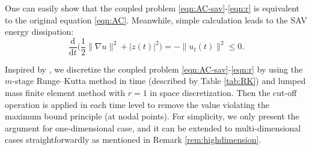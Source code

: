 \documentclass[10pt,final,leqno,onefignum,onetabnum]{siamltex}%
\def\d{\textrm{d}}
\def\d{\mathrm{d}}
\begin{document}
One can easily show that the coupled problem \eqref{eqn:AC-sav}-\eqref{eqn:r} is equivalent to the original
equation \eqref{eqn:AC}.  Meanwhile, simple calculation leads to the SAV energy dissipation:
\begin{equation}\label{eq:SAV_energy}
  \frac{\d}{\d t} \Big(\frac12\|\nabla u\|^2 + |z(t)|^2 \Big)=-\|u_t(t)\|^2 \le 0.
\end{equation}

Inspired by \cite{akrivis2019energy},
we discretize the coupled problem \eqref{eqn:AC-sav}-\eqref{eqn:r}
by using the  $m$-stage Runge--Kutta method in time (described by Table \ref{tab:RK}) and  lumped mass
finite element method with $r=1$ in space discretization. Then the cut-off operation is applied in each time level
to remove the value violating the maximum bound principle (at nodal points).
For simplicity, we only present the argument for one-dimensional case,
and it can be extended to multi-dimensional cases straightforwardly as mentioned in Remark \ref{rem:highdimension}.
\end{document}
